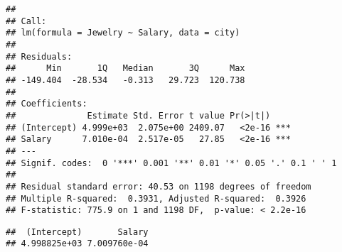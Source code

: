 \documentclass[
]{article}
\newenvironment{Shaded}{\begin{snugshade}}{\end{snugshade}}
\newcommand{\CommentTok}[1]{\textcolor[rgb]{0.56,0.35,0.01}{\textit{#1}}}
\newcommand{\FunctionTok}[1]{\textcolor[rgb]{0.00,0.00,0.00}{#1}}
\newcommand{\NormalTok}[1]{#1}
\newcommand{\OtherTok}[1]{\textcolor[rgb]{0.56,0.35,0.01}{#1}}
\newcommand{\SpecialCharTok}[1]{\textcolor[rgb]{0.00,0.00,0.00}{#1}}
\begin{document}
\begin{verbatim}
## 
## Call:
## lm(formula = Jewelry ~ Salary, data = city)
## 
## Residuals:
##      Min       1Q   Median       3Q      Max 
## -149.404  -28.534   -0.313   29.723  120.738 
## 
## Coefficients:
##              Estimate Std. Error t value Pr(>|t|)    
## (Intercept) 4.999e+03  2.075e+00 2409.07   <2e-16 ***
## Salary      7.010e-04  2.517e-05   27.85   <2e-16 ***
## ---
## Signif. codes:  0 '***' 0.001 '**' 0.01 '*' 0.05 '.' 0.1 ' ' 1
## 
## Residual standard error: 40.53 on 1198 degrees of freedom
## Multiple R-squared:  0.3931, Adjusted R-squared:  0.3926 
## F-statistic: 775.9 on 1 and 1198 DF,  p-value: < 2.2e-16
\end{verbatim}

\begin{Shaded}
\end{Shaded}

\begin{verbatim}
##  (Intercept)       Salary 
## 4.998825e+03 7.009760e-04
\end{verbatim}
\end{document}
